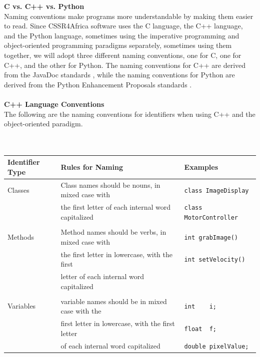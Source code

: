 \documentclass{CSSRforAfrica}
\newcommand{\blank}{~\\}
\begin{document}
\begin{appendices}
{\bf C vs. C++ vs. Python}\\
Naming conventions make programs more understandable by making them easier to read.  
Since CSSR4Africa software uses the C language, the C++ language, and the Python language, sometimes 
using the imperative programming and object-oriented programming paradigms separately, 
sometimes using them together, we will adopt three different naming conventions, one
for C, one for C++, and the other for Python. The naming conventions for C++ are derived from the JavaDoc standards \cite{java}, while the naming conventions for Python are derived from the Python Enhancement Proposals standards \cite{pep8}.
\blank
~
\blank
\newpage
\noindent
{\bf C++ Language Conventions}\\
The following are the naming conventions for identifiers when using C++ and the 
object-oriented paradigm. 
\blank
~
\blank
~
{\small
\begin{tabular}{l|l l}
Identifier Type & Rules for Naming                                   &Examples                                 \\ \hline
Classes         & Class names should be nouns, in mixed case with    &\verb+class ImageDisplay+                \\ 
                & the first letter of each internal word capitalized &\verb+class MotorController+             \\ 
                &                                                    &                                         \\ 
Methods         & Method names should be verbs, in mixed case with   &\verb+int grabImage()+                   \\ 
                & the first letter in lowercase, with the first      &\verb+int setVelocity()+                 \\ 
                & letter of each internal word capitalized           &                                         \\ 
                &                                                    &                                         \\ 
Variables       & variable names should be in mixed case with the    &{\small \verb+int    i;+}                \\ 
                & first letter in lowercase, with the first letter   &{\small \verb+float  f;+}                \\ 
                & of each internal word capitalized                  &{\small \verb+double pixelValue;+}       \\ 

\end{tabular}}
\end{appendices}
\end{document}

